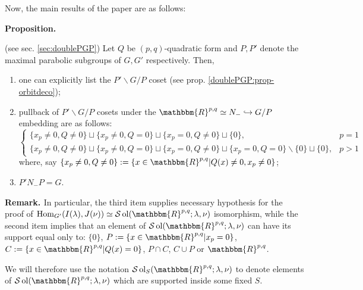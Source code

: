 \documentclass{article}
\newcommand{\assign}{:=}
\newcommand{\tmop}[1]{\ensuremath{\operatorname{#1}}}
\newcommand{\tmtextbf}[1]{{\bfseries{#1}}}
\newcommand{\tmtextit}[1]{{\itshape{#1}}}
\numberwithin{definition}{section}
\numberwithin{lemma}{section}
\numberwithin{proposition}{section}
{\theorembodyfont{\rmfamily}\newtheorem{remark}{Remark}
\numberwithin{remark}{section}
}
\begin{document}
{\noindent}Now, the main results of the paper are as follows:

{\noindent}\tmtextbf{Proposition. }\tmtextit{(see sec. \ref{sec:doublePGP})
Let $Q$ be $( p, q)$-quadratic form and $P, P'$ denote the maximal parabolic
subgroups of $G, G'$ respectively. Then,
\begin{enumerate}
  \item one can explicitly list the $P' \backslash G / P$ coset (see prop.
  \ref{doublePGP:prop-orbitdeco});
  
  \item pullback of $P' \backslash G / P$ cosets under the $\mathbbm{R}^{p, q}
  \simeq N_- \hookrightarrow G / P$ embedding are as follows:
  \[ \left\{ \begin{array}{ll}
       \{ x_p \neq 0, Q \neq 0 \} \sqcup \{ x_p \neq 0, Q = 0 \} \sqcup \{ x_p
       = 0, Q \neq 0 \} \sqcup \{ 0 \}, & p = 1\\
       \{ x_p \neq 0, Q \neq 0 \} \sqcup \{ x_p \neq 0, Q = 0 \} \sqcup \{ x_p
       = 0, Q \neq 0 \} \sqcup \{ x_p = 0, Q = 0 \} \backslash \{ 0 \} \sqcup
       \{ 0 \}, & p > 1
     \end{array} \right. \]
  where, say $\{ x_p \neq 0, Q \neq 0 \} \assign \{ x \in \mathbbm{R}^{p, q} |
  Q ( x) \neq 0, x_p \neq 0 \}$;
  
  \item $P' N_- P = G$.
\end{enumerate}}{\hspace*{\fill}}{\medskip}

{\noindent}\tmtextbf{Remark. }In particular, the third item supplies necessary
hypothesis for the proof of $\tmop{Hom}_{G'} ( I ( \lambda), J ( \nu)) \simeq
\mathcal{S} \tmop{ol} ( \mathbbm{R}^{p, q} ; \lambda, \nu)$ isomorphism, while
the second item implies that an element of $\mathcal{S} \tmop{ol} (
\mathbbm{R}^{p, q} ; \lambda, \nu)$ can have its support equal only to: $\{ 0
\}$, $P \assign \{ x \in \mathbbm{R}^{p, q} | x_p = 0 \}$, $C \assign \{ x \in
\mathbbm{R}^{p, q} | Q ( x) = 0 \}$, $P \cap C$, $C \cup P$ or
$\mathbbm{R}^{p, q}$.

We will therefore use the notation $\mathcal{S} \tmop{ol}_S ( \mathbbm{R}^{p,
q} ; \lambda, \nu)$ to denote elements of $\mathcal{S} \tmop{ol} (
\mathbbm{R}^{p, q} ; \lambda, \nu)$ which are supported inside some fixed
$S$.{\hspace*{\fill}}{\medskip}
\end{document}
